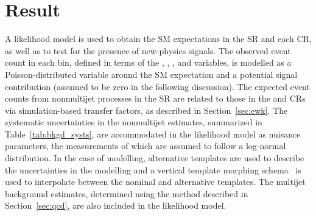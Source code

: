 \section{Result}
\label{sec:result}

A likelihood model is used to obtain the SM expectations in the SR and
each CR, as well as to test for the presence of new-physics
signals. The observed event count in each bin, defined in terms of the
\njet, \nb, \scalht, and \mht variables, is modelled as a
Poisson-distributed variable around the SM expectation and a potential
signal contribution (assumed to be zero in the following
discussion). The expected event counts from nonmultijet processes in
the SR are related to those in the \mj and \mmj CRs via
simulation-based transfer factors, as described in
Section~\ref{sec:ewk}. The systematic uncertainties in the nonmultijet
estimates, summarized in Table~\ref{tab:bkgd_systs}, are accommodated
in the likelihood model as nuisance parameters, the measurements of
which are assumed to follow a log-normal distribution. In the case of
\mht modelling, alternative templates are used to describe the
uncertainties in the \mht modelling and a vertical template morphing
schema~\cite{Prosper:2011zz, Khachatryan:2016dvc} is used to
interpolate between the nominal and alternative templates. The
multijet background estimates, determined using the method described
in Section~\ref{sec:qcd}, are also included in the likelihood model.

